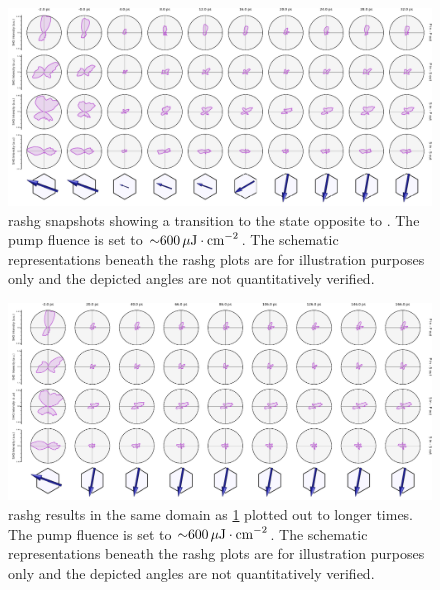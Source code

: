 \begin{landscape}
\begin{figure}
\centering
\includegraphics[width=\textwidth]{./gfx/ch6/C2B_short.pdf}
\caption[Transition of \cmb to the state opposite of that presented in the main text]{\label{cmb-CtoBshort}\gls{rashg} snapshots showing a transition to the state opposite to .
The pump fluence is set to ${\sim} \qty{600}{\mu J \cdot cm^{-2}}$.
\lastrow
The schematic representations beneath the \gls{rashg} plots are for illustration purposes only and the depicted angles are not quantitatively verified.
}
\end{figure}
\end{landscape}

\begin{landscape}
\begin{figure}
\centering
\includegraphics[width=\textwidth]{./gfx/ch6/C2B_long.pdf}
\caption[Transiton of \cmb to state opposite of that presented in the main text, at long times]{\label{cmb-CtoBlong}\gls{rashg} results in the same domain as \cref{cmb-CtoBshort} plotted out to longer times.
The pump fluence is set to ${\sim} \qty{600}{\mu J \cdot cm^{-2}}$.
\lastrow
The schematic representations beneath the \gls{rashg} plots are for illustration purposes only and the depicted angles are not quantitatively verified.
}
\end{figure}
\end{landscape}

